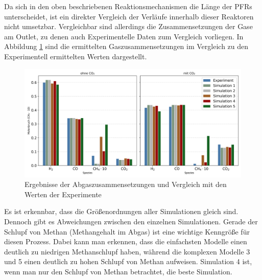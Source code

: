        Da sich in den oben beschriebenen Reaktionsmechanismen die Länge der PFRs unterscheidet, ist ein direkter Vergleich der Verläufe innerhalb dieser Reaktoren nicht umsetzbar. Vergleichbar sind allerdings die Zusammensetzungen der Gase am Outlet, zu denen auch Experimentelle Daten zum Vergleich vorliegen. In Abbildung \ref{fig:erweiterungen_vergleich_stoffe} sind die ermittelten Gaszusammensetzungen im Vergleich zu den Experimentell ermittelten Werten dargestellt. 
        \begin{figure}[H]
            \centering
            \includegraphics[width=0.9\linewidth]{img/Erweiterungen/Vergleich_Erweiterungen.png}
            \caption{Ergebnisse der Abgaszusammensetzungen und Vergleich mit den Werten der Experimente \cite{gonzales}}
            \label{fig:erweiterungen_vergleich_stoffe}
        \end{figure}
        Es ist erkennbar, dass die Größenordnungen aller Simulationen gleich sind. Dennoch gibt es Abweichungen zwischen den einzelnen Simulationen. Gerade der Schlupf von Methan (Methangehalt im Abgas) ist eine wichtige Kenngröße für diesen Prozess. Dabei kann man erkennen, dass die einfachsten Modelle einen deutlich zu niedrigen Methanschlupf haben, während die komplexen Modelle 3 und 5 einen deutlich zu hohen Schlupf von Methan aufweisen. Simulation 4 ist, wenn man nur den Schlupf von Methan betrachtet, die beste Simulation. 

